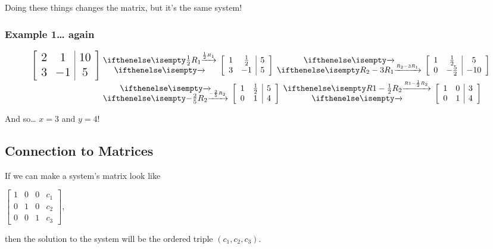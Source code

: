 \documentclass[
  letterpaper,
  DIV=11,
  numbers=noendperiod]{scrartcl}
\begin{document}
Doing these things changes the matrix, but it's the same system!

\hypertarget{example-1-again}{%
\subsubsection{Example 1\ldots{} again}\label{example-1-again}}


\begin{align*}
\Large
\left[\begin{array}{cc|c}2 & 1 & 10 \\ 3 & -1 & 5 \end{array} \right]&\rowops{\frac{1}{2}R_1,}\left[\begin{array}{cc|c}1 & \frac{1}{2} & 5 \\ 3 & -1 & 5 \end{array} \right] \rowops{,R_2-3R_1}\left[\begin{array}{cc|c}1 & \frac{1}{2} & 5 \\ 0 & -\frac{5}{2} & -10 \end{array}\right] \\
&\rowops{,-\frac{2}{5}R_2} \left[\begin{array}{cc|c}1 & \frac{1}{2} & 5 \\ 0 & 1 & 4 \end{array}\right]\rowops{R1-\frac{1}{2}R_2,}\left[\begin{array}{cc|c}1 & 0 & 3 \\ 0 & 1 & 4 \end{array}\right]
\end{align*}

And so\ldots{} \(x=3\) and \(y=4\)!

\hypertarget{connection-to-matrices}{%
\subsection{Connection to Matrices}\label{connection-to-matrices}}

If we can make a system's matrix look like

\(\left[\begin{array}{ccc|c}1 & 0 & 0 & c_1 \\ 0 & 1 & 0 & c_2 \\ 0 & 0 & 1 & c_3 \end{array}\right]\),

then the solution to the system will be the ordered triple
\((c_1, c_2, c_3)\).
\end{document}
